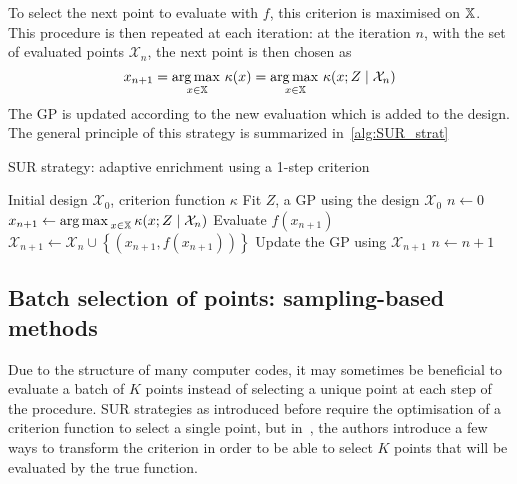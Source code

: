 \documentclass[../../Main_ManuscritThese.tex]{subfiles}
\begin{document}
To select the next point to evaluate with $f$, this criterion is
maximised on $\mathbb{X}$.  This procedure is then repeated at each
iteration: at the iteration $n$, with the set of evaluated points
$\mathcal{X}_n$, the next point is then chosen as
\begin{equation}
  x_{n+1} = \operatorname*{arg\,max \,}_{x\in\mathbb{X}} \kappa(x) = \operatorname*{arg\,max \,}_{x\in\mathbb{X}} \kappa(x; Z \mid \mathcal{X}_n)
\end{equation}
The GP is updated according to the new evaluation which is added to
the design. The general principle of this strategy is summarized
in~\cref{alg:SUR_strat}

\begin{algorithm}
  \caption{\label{alg:SUR_strat} SUR strategy: adaptive enrichment using a 1-step criterion}
\begin{algorithmic}
\REQUIRE Initial design $\mathcal{X}_0$, criterion function $\kappa$
\STATE Fit $Z$, a GP using the design $\mathcal{X}_0$
\STATE $n \leftarrow 0$
\STATE $x_{n+1} \leftarrow \operatorname*{arg\,max \,}_{x \in \mathbb{X}} \kappa(x; Z \mid \mathcal{X}_{n})$
\STATE Evaluate $f(x_{n+1})$
\STATE $\mathcal{X}_{n+1} \leftarrow \mathcal{X}_n \cup \left\{\left(x_{n+1}, f(x_{n+1})\right)\right\}$
\STATE Update the GP using $\mathcal{X}_{n+1}$
\STATE $n \leftarrow n + 1$
\ENDWHILE
\end{algorithmic}
\end{algorithm}


\subsection{Batch selection of points: sampling-based methods}
\label{sec:sampling_based_criterion}

Due to the structure of many computer codes, it may sometimes be
beneficial to evaluate a batch of $K$ points instead of selecting a
unique point at each step of the procedure. SUR strategies as
introduced before require the optimisation of a criterion function to
select a single point, but in~\cite{ginsbourger_kriging_2010}, the
authors introduce a few ways to transform the criterion in order to be
able to select $K$ points that will be evaluated by the true function.
\end{document}
